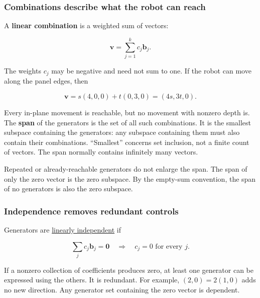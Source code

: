 \subsubsection{Combinations describe what the robot can reach}\label{01-foundations-i-ch017-combinations-describe-what-the-robot-can-reach}

\hypertarget{01-foundations-i-ch017-combinations-describe-what-the-robot-can-reach}{}

A \textbf{linear combination} is a weighted sum of vectors:

\[
\mathbf v=\sum_{j=1}^{k}c_j\mathbf b_j.
\]

The weights \(c_j\) may be negative and need not sum to one. If the robot can move along the panel edges, then

\[
\mathbf v=s(4,0,0)+t(0,3,0)=(4s,3t,0).
\]

Every in-plane movement is reachable, but no movement with nonzero depth is. The \textbf{span} of the generators is the set of all such combinations. It is the smallest subspace containing the generators: any subspace containing them must also contain their combinations. ``Smallest'' concerns set inclusion, not a finite count of vectors. The span normally contains infinitely many vectors.

Repeated or already-reachable generators do not enlarge the span. The span of only the zero vector is the zero subspace. By the empty-sum convention, the span of no generators is also the zero subspace.

\subsubsection{Independence removes redundant controls}\label{01-foundations-i-ch017-independence-removes-redundant-controls}

\hypertarget{01-foundations-i-ch017-independence-removes-redundant-controls}{}

Generators are \hyperref[01-foundations-i-ch019-coordinates-can-change-while-the-geometric-object-stays-still]{linearly independent} if

\[
\sum_jc_j\mathbf b_j=\mathbf0
\quad\Longrightarrow\quad c_j=0\text{ for every }j.
\]

If a nonzero collection of coefficients produces zero, at least one generator can be expressed using the others. It is redundant. For example, \((2,0)=2(1,0)\) adds no new direction. Any generator set containing the zero vector is dependent.

